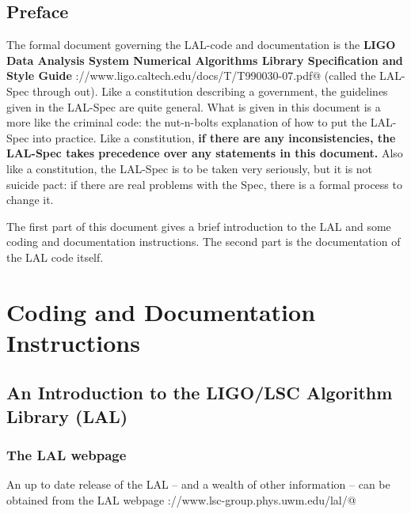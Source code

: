 \documentclass[oneside]{book}
\begin{document}
\tableofcontents

\chapter*{Preface}
The formal document governing the LAL-code and documentation is the
{\bf LIGO Data Analysis System Numerical Algorithms Library
Specification and Style Guide}
\verb@http://www.ligo.caltech.edu/docs/T/T990030-07.pdf@ (called the
LAL-Spec through out).  Like a constitution describing a government,
the guidelines given in the LAL-Spec are quite general. What is given
in this document  is a more like the criminal code: the nut-n-bolts
explanation of how to put the LAL-Spec into practice.  Like a
constitution, {\bf if there are any inconsistencies,  the LAL-Spec
takes precedence over any statements in this document.} Also like a
constitution, the LAL-Spec is to be taken very seriously, but it is
not suicide pact: if there are real problems with the Spec, there is a
formal process to change it.

The first part of this document gives a brief introduction to the LAL
and some coding and documentation instructions.  The second part is
the documentation of the LAL code itself.

\part{Coding and Documentation Instructions}

\chapter{An Introduction to the LIGO/LSC Algorithm Library (LAL)}

\section{The LAL webpage}

An up to date release  of the LAL -- and a wealth of other information
-- can be obtained from the LAL webpage
\verb@http://www.lsc-group.phys.uwm.edu/lal/@
\end{document}
